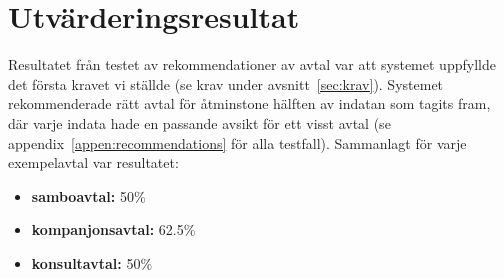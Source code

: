 \documentclass[a4paper,12pt]{article}
\begin{document}



\section{Utvärderingsresultat}


Resultatet från testet av rekommendationer av avtal var att systemet uppfyllde det första kravet vi ställde (se krav under avsnitt~\ref{sec:krav}). Systemet rekommenderade rätt avtal för åtminstone hälften av indatan som tagits fram, där varje indata hade en passande avsikt för ett visst avtal (se appendix~\ref{appen:recommendations} för alla testfall). Sammanlagt för varje exempelavtal var resultatet:
\begin{itemize}
    \item \textbf{samboavtal:} 50\%  
    \item \textbf{kompanjonsavtal:} 62.5\%  
    \item \textbf{konsultavtal:} 50\%
\end{itemize}
\end{document}
